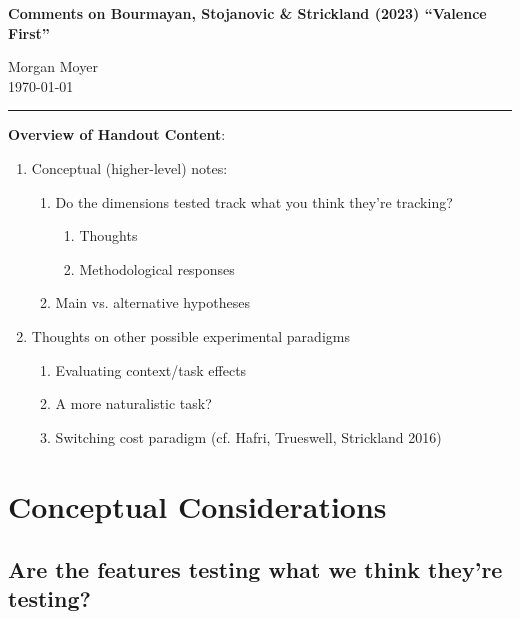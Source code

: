 \documentclass[12pt,letterpaper,table,svgnames,dvipsnames]{article}
\begin{document}
\noindent \Large\textbf{Comments on Bourmayan, Stojanovic \& Strickland (2023) ``Valence First''}
\bigskip

\large 
\noindent Morgan Moyer \\ 
\normalsize
\noindent \today \\

\hrule

\bigskip
\bigskip


\bigskip 
\noindent \textbf{Overview of Handout Content}:

\begin{enumerate}[noitemsep]
    \item Conceptual (higher-level) notes:
         \begin{enumerate}[noitemsep]
            \item Do the dimensions tested track what you think they're tracking?
                \begin{enumerate}[noitemsep]
                    \item Thoughts
                    \item Methodological responses
                \end{enumerate}
            \item Main vs. alternative hypotheses \\
        \end{enumerate}


    \item Thoughts on other possible experimental paradigms
        \begin{enumerate}[noitemsep]
            \item Evaluating context/task effects
            \item A more naturalistic task?
            \item Switching cost paradigm (cf. Hafri, Trueswell, Strickland 2016)
        \end{enumerate}
\end{enumerate}

\section{Conceptual Considerations}


\subsection{Are the features testing what we think they're testing?}
\end{document}
